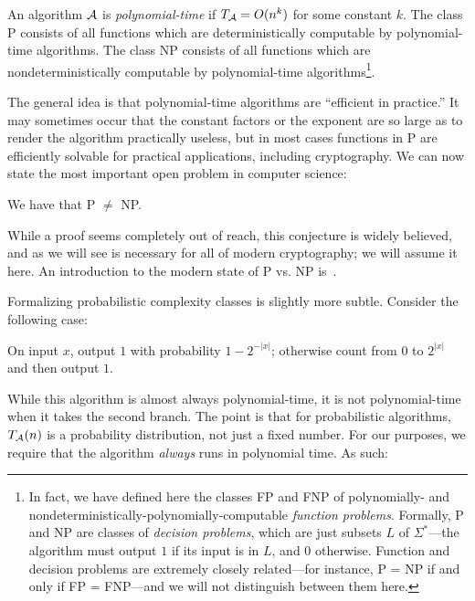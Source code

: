 \begin{dfn}
  An algorithm $\mathcal{A}$ is \emph{polynomial-time} if $T_{\mathcal{A}} = O(n^k)$ for some
  constant $k$. The class P consists of all functions which are
  deterministically computable by polynomial-time algorithms. The class NP
  consists of all functions which are nondeterministically computable by
  polynomial-time algorithms\footnote{
    In fact, we have defined here the classes FP and FNP of polynomially- and
    nondeterministically-polynomially-computable \emph{function problems}.
    Formally, P and NP are classes of \emph{decision problems}, which are just
    subsets $L$ of $\Sigma^*$---the algorithm must output $1$ if its input is in
    $L$, and $0$ otherwise. Function and decision problems are extremely closely
    related---for instance, P = NP if and only if FP = FNP---and we will not
    distinguish between them here.
  }.
\end{dfn}

The general idea is that polynomial-time algorithms are ``efficient in
practice.'' It may sometimes occur that the constant factors or the exponent are
so large as to render the algorithm practically useless, but in most cases
functions in P are efficiently solvable for practical applications, including
cryptography. We can now state the most important open problem in computer
science:

\begin{conj}
  We have that P $\neq$ NP.
\end{conj}

While a proof seems completely out of reach, this conjecture is widely
believed, and as we will see is necessary for all of modern cryptography; we
will assume it here. An introduction to the modern state of P vs. NP
is~\cite{anderson-2017}.

Formalizing probabilistic complexity classes is slightly more subtle. Consider
the following case:
\begin{_algo}
  On input $x$, output $1$ with probability $1 - 2^{-|x|}$; otherwise count from
  $0$ to $2^{|x|}$ and then output $1$.
\end{_algo}

While this algorithm is almost always polynomial-time, it is not polynomial-time
when it takes the second branch. The point is that for probabilistic algorithms,
$T_{\mathcal{A}}(n)$ is a probability distribution, not just a fixed number. For our
purposes, we require that the algorithm \emph{always} runs in polynomial time.
As such:

